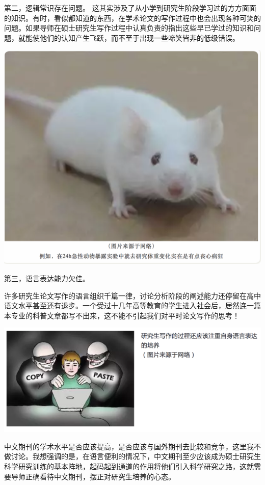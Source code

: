 \documentclass[]{book}
\begin{document}
第二，逻辑常识存在问题。
这其实涉及了从小学到研究生阶段学习过的方方面面的知识。有时，看似都知道的东西，在学术论文的写作过程中也会出现各种可笑的问题。如果导师在硕士研究生写作过程中认真负责的指出这些早已学过的知识和问题，就能使他们的认知产生飞跃，而不至于出现一些啼笑皆非的低级错误。

\includegraphics[width=8.33in]{images/edit4}

第三，语言表达能力欠佳。

许多研究生论文写作的语言组织千篇一律，讨论分析阶段的阐述能力还停留在高中语文水平甚至还有退步。一个受过十几年高等教育的学生进入社会后，居然连一篇本专业的科普文章都写不出来，这不能不引起我们对平时论文写作的思考！

\includegraphics[width=8.33in]{images/edit5}

中文期刊的学术水平是否应该提高，是否应该与国外期刊去比较和竞争，这里我不做讨论。我想强调的是，在语言便利的情况下，中文期刊至少应该成为硕士研究生科学研究训练的基本阵地，起码起到通道的作用将他们引入科学研究之路，这就需要导师正确看待中文期刊，摆正对研究生培养的心态。
\end{document}
